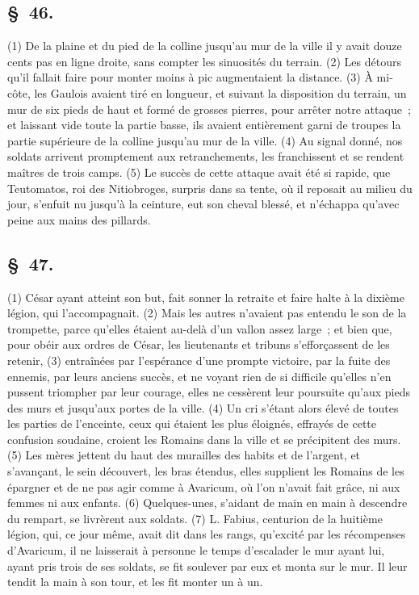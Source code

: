 \documentclass[french,twoside]{book} %
\begin{document}
\subsection[{§ 46.}]{ \textsc{§ 46.} }
\noindent (1) De la plaine et du pied de la colline jusqu’au mur de la ville il y avait douze cents pas en ligne droite, sans compter les sinuosités du terrain. (2) Les détours qu’il fallait faire pour monter moins à pic augmentaient la distance. (3) À mi-côte, les Gaulois avaient tiré en longueur, et suivant la disposition du terrain, un mur de six pieds de haut et formé de grosses pierres, pour arrêter notre attaque ; et laissant vide toute la partie basse, ils avaient entièrement garni de troupes la partie supérieure de la colline jusqu’au mur de la ville. (4) Au signal donné, nos soldats arrivent promptement aux retranchements, les franchissent et se rendent maîtres de trois camps. (5) Le succès de cette attaque avait été si rapide, que Teutomatos, roi des Nitiobroges, surpris dans sa tente, où il reposait au milieu du jour, s’enfuit nu jusqu’à la ceinture, eut son cheval blessé, et n’échappa qu’avec peine aux mains des pillards.
\subsection[{§ 47.}]{ \textsc{§ 47.} }
\noindent (1) César ayant atteint son but, fait sonner la retraite et faire halte à la dixième légion, qui l’accompagnait. (2) Mais les autres n’avaient pas entendu le son de la trompette, parce qu’elles étaient au-delà d’un vallon assez large ; et bien que, pour obéir aux ordres de César, les lieutenants et tribuns s’efforçassent de les retenir, (3) entraînées par l’espérance d’une prompte victoire, par la fuite des ennemis, par leurs anciens succès, et ne voyant rien de si difficile qu’elles n’en pussent triompher par leur courage, elles ne cessèrent leur poursuite qu’aux pieds des murs et jusqu’aux portes de la ville. (4) Un cri s’étant alors élevé de toutes les parties de l’enceinte, ceux qui étaient les plus éloignés, effrayés de cette confusion soudaine, croient les Romains dans la ville et se précipitent des murs. (5) Les mères jettent du haut des murailles des habits et de l’argent, et s’avançant, le sein découvert, les bras étendus, elles supplient les Romains de les épargner et de ne pas agir comme à Avaricum, où l’on n’avait fait grâce, ni aux femmes ni aux enfants. (6) Quelques-unes, s’aidant de main en main à descendre du rempart, se livrèrent aux soldats. (7) L. Fabius, centurion de la huitième légion, qui, ce jour même, avait dit dans les rangs, qu’excité par les récompenses d’Avaricum, il ne laisserait à personne le temps d’escalader le mur ayant lui, ayant pris trois de ses soldats, se fit soulever par eux et monta sur le mur. Il leur tendit la main à son tour, et les fit monter un à un.
\end{document}
